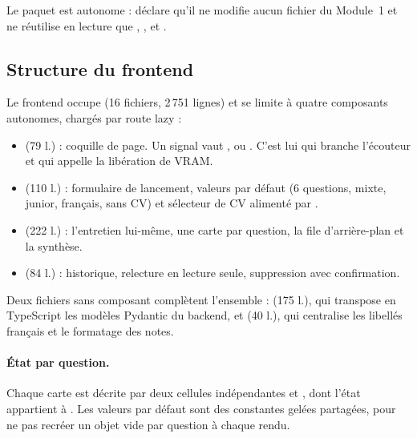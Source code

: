 Le paquet est autonome :  déclare
qu'il ne modifie aucun fichier du Module~1 et ne réutilise en lecture que
, ,  et .

\subsection{Structure du frontend}

Le frontend occupe  (16 fichiers,
2\,751 lignes) et se limite à quatre composants autonomes, chargés par route
lazy :

\begin{itemize}[leftmargin=1.6em,itemsep=1pt,topsep=2pt]
  \item {} (79 l.) : coquille de page. Un signal
     vaut ,  ou .
    C'est lui qui branche l'écouteur  et qui appelle la
    libération de VRAM.
  \item {} (110 l.) : formulaire de lancement,
    valeurs par défaut (6 questions, mixte, junior, français, sans CV) et
    sélecteur de CV alimenté par .
  \item {} (222 l.) : l'entretien lui-même, une carte
    par question, la file d'arrière-plan et la synthèse.
  \item {} (84 l.) : historique, relecture en
    lecture seule, suppression avec confirmation.
\end{itemize}

Deux fichiers sans composant complètent l'ensemble :  (175 l.),
qui transpose en TypeScript les modèles Pydantic du backend, et
 (40 l.), qui centralise les libellés français et le formatage
des notes.

\paragraph{État par question.} Chaque carte est décrite par deux cellules
indépendantes  et , dont l'état appartient à
. Les valeurs par
défaut sont des constantes gelées partagées, pour ne pas recréer un objet vide
par question à chaque rendu.

